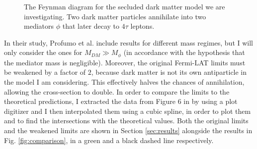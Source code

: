 \begin{figure}[htbp]
	\centering
	\caption{The Feynman diagram for the secluded dark matter model we are investigating. Two dark matter particles annihilate into two mediators \(\phi \) that later decay to \(4\tau \) leptons.}
	\label{fig:feynman}
\end{figure}

In their study, Profumo et al. include results for different mass regimes, but I will only consider the ones for \(M_{DM} \gg M_{\phi } \) (in accordance with the hypothesis that the mediator mass is negligible). Moreover, the original Fermi-LAT limits must be weakened by a factor of \(2\), because dark matter is not its own antiparticle in the model I am considering.
This effectively halves the chances of annihilation, allowing the cross-section to double. In order to compare the limits to the theoretical predictions, I extracted the data from Figure 6 in \cite{Profumo_2018} by using a plot digitizer and I then interpolated them using a cubic spline, in order to plot them and to find the intersections with the theoretical values.
Both the original limits and the weakened limits are shown in Section \ref{sec:results} alongside the results in Fig. \ref{fig:comparison}, in a green and a black dashed line respectively.

